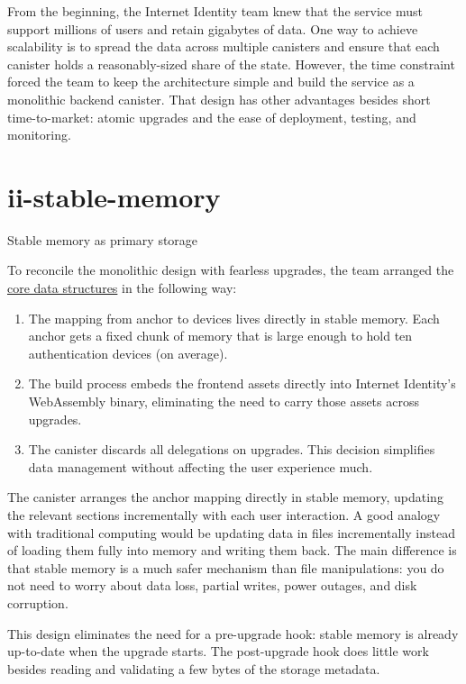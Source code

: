 \documentclass{article}
\begin{document}
From the beginning, the Internet Identity team knew that the service must support millions of users and retain gigabytes of data.
One way to achieve scalability is to spread the data across multiple canisters and ensure that each canister holds a reasonably-sized share of the state.
However, the time constraint forced the team to keep the architecture simple and build the service as a monolithic backend canister.
That design has other advantages besides short time-to-market: atomic upgrades and the ease of deployment, testing, and monitoring.

\section{ii-stable-memory}{Stable memory as primary storage}

To reconcile the monolithic design with fearless upgrades, the team arranged the \href{#ii-data-model}{core data structures} in the following way:
\begin{enumerate}
  \item
    The mapping from anchor to devices lives directly in stable memory.
    Each anchor gets a fixed chunk of memory that is large enough to hold ten authentication devices (on average).
  \item
    The build process embeds the frontend assets directly into Internet Identity's WebAssembly binary, eliminating the need to carry those assets across upgrades.
  \item
    The canister discards all delegations on upgrades.
    This decision simplifies data management without affecting the user experience much.
\end{enumerate}

The canister arranges the anchor mapping directly in stable memory, updating the relevant sections incrementally with each user interaction.
A good analogy with traditional computing would be updating data in files incrementally instead of loading them fully into memory and writing them back.
The main difference is that stable memory is a much safer mechanism than file manipulations: you do not need to worry about data loss, partial writes, power outages, and disk corruption.

This design eliminates the need for a pre-upgrade hook: stable memory is already up-to-date when the upgrade starts.
The post-upgrade hook does little work besides reading and validating a few bytes of the storage metadata.
\end{document}

